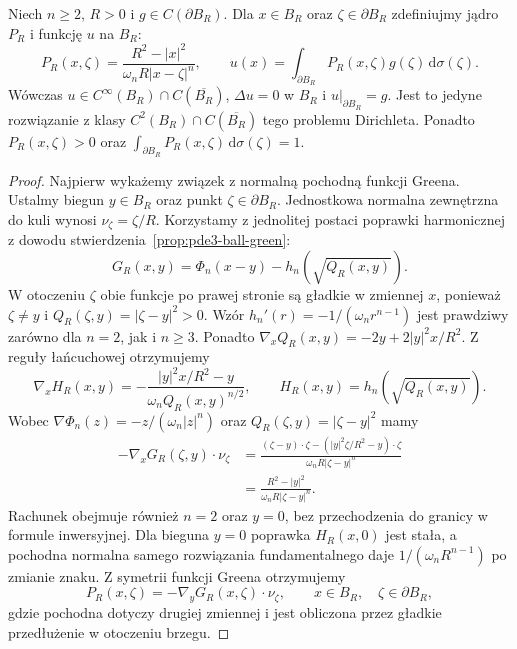 \begin{twierdzenie}
\label{thm:pde3-poisson}
Niech $n\geq2$, $R>0$ i $g\in C(\partial B_R)$.
Dla $x\in B_R$ oraz $\zeta\in\partial B_R$ zdefiniujmy
jądro $P_R$ i funkcję $u$ na $B_R$:
\begin{equation}\label{eq:pde3-poisson}
 P_R(x,\zeta)=\frac{R^2-|x|^2}{\omega_n R|x-\zeta|^n},
 \qquad
 u(x)=\int_{\partial B_R}P_R(x,\zeta)g(\zeta)
 \,\mathrm d\sigma(\zeta).
\end{equation}
Wówczas $u\in C^\infty(B_R)\cap C(\overline{B_R})$,
$\Delta u=0$ w $B_R$ i $u|_{\partial B_R}=g$.
Jest to jedyne rozwiązanie z klasy
$C^2(B_R)\cap C(\overline{B_R})$ tego problemu Dirichleta.
Ponadto $P_R(x,\zeta)>0$ oraz
$\int_{\partial B_R}P_R(x,\zeta)\,\mathrm d\sigma(\zeta)=1$.
\end{twierdzenie}
\begin{proof}
Najpierw wykażemy związek z normalną pochodną funkcji
Greena. Ustalmy biegun $y\in B_R$ oraz punkt
$\zeta\in\partial B_R$. Jednostkowa normalna zewnętrzna
do kuli wynosi $\nu_\zeta=\zeta/R$.
Korzystamy z jednolitej postaci poprawki harmonicznej
z dowodu stwierdzenia~\ref{prop:pde3-ball-green}:
\[
 G_R(x,y)=\Phi_n(x-y)-h_n(\sqrt{Q_R(x,y)}).
\]
W otoczeniu $\zeta$ obie funkcje po prawej stronie
są gładkie w zmiennej $x$, ponieważ $\zeta\ne y$
i $Q_R(\zeta,y)=|\zeta-y|^2>0$.
Wzór $h_n'(r)=-1/(\omega_n r^{n-1})$ jest prawdziwy
zarówno dla $n=2$, jak i $n\geq3$.
Ponadto
$\nabla_x Q_R(x,y)=-2y+2|y|^2x/R^2$.
Z reguły łańcuchowej otrzymujemy
\[
 \nabla_x H_R(x,y)=
 -\frac{|y|^2x/R^2-y}{\omega_n Q_R(x,y)^{n/2}},
 \qquad H_R(x,y)=h_n(\sqrt{Q_R(x,y)}).
\]
Wobec $\nabla\Phi_n(z)=-z/(\omega_n|z|^n)$
oraz $Q_R(\zeta,y)=|\zeta-y|^2$ mamy
\[
 \begin{aligned}
 -\nabla_xG_R(\zeta,y)\cdot\nu_\zeta
 &=\frac{(\zeta-y)\cdot\zeta
       -( |y|^2\zeta/R^2-y)\cdot\zeta}
       {\omega_n R|\zeta-y|^n}\\
 &=\frac{R^2-|y|^2}{\omega_n R|\zeta-y|^n}.
 \end{aligned}
\]
Rachunek obejmuje również $n=2$ oraz $y=0$,
bez przechodzenia do granicy w formule inwersyjnej.
Dla bieguna $y=0$ poprawka $H_R(x,0)$ jest stała,
a pochodna normalna samego rozwiązania fundamentalnego
daje $1/(\omega_n R^{n-1})$ po zmianie znaku.
Z symetrii funkcji Greena otrzymujemy
\[
 P_R(x,\zeta)=-\nabla_yG_R(x,\zeta)\cdot\nu_\zeta,
 \qquad x\in B_R,\quad \zeta\in\partial B_R,
\]
gdzie pochodna dotyczy drugiej zmiennej i jest obliczona
przez gładkie przedłużenie w otoczeniu brzegu.


\end{proof}
